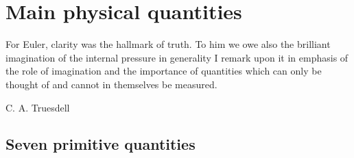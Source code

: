 \documentclass[a4paper,12pt,%
onecolumn,oneside,%
british%
]{memoir}
\renewcommand*{\|}[1][]{\nonscript\:#1\vert\nonscript\:\mathopen{}}
\begin{document}
%
%
%
%





\printpagenotes*
\cleartooddpage
\chapter{Main physical quantities}
\label{cha:stuff}

\epigraph{For Euler, clarity was the hallmark of truth. \textelp{} To him we owe also the brilliant imagination of the internal pressure in generality
  \textelp{} I remark upon it in emphasis of the role of imagination and the importance of quantities which can only be thought of and cannot in themselves be measured.}{C. A. Truesdell \cites*{truesdell1956d}}



\section[Seven primitive quantities]{Seven primitive quantities}
\label{sec:stuff}
\end{document}
